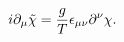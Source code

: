 \begin{equation} i\partial_{\mu}\tilde\chi= {g\over  T}
\epsilon_{\mu\nu}\partial^\nu \chi. \label{chid} \end{equation}

